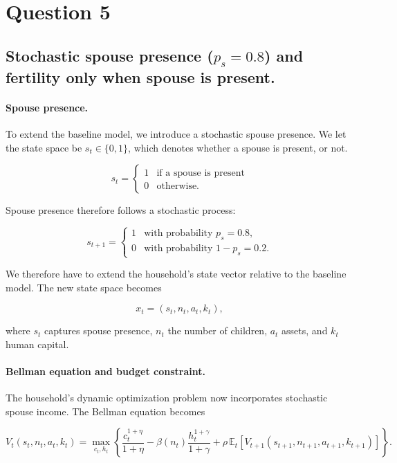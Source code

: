 \section{Question 5}

\subsection{Stochastic spouse presence ($p_s=0.8$) and fertility only when spouse is present.}

\bigskip

\paragraph{Spouse presence.}

To extend the baseline model, we introduce a stochastic spouse presence. We let the state space be $s_t \in \{0,1\}$, which denotes whether a spouse is present, or not. 

\[
s_t =
\begin{cases}
1 & \text{if a spouse is present} \\
0 & \text{otherwise.}
\end{cases}
\]

Spouse presence therefore follows a stochastic process:

\[
s_{t+1} =
\begin{cases}
1 & \text{with probability } p_s = 0.8, \\
0 & \text{with probability } 1-p_s = 0.2.
\end{cases}
\]

We therefore have to extend the household's state vector relative to the baseline model. The new state space becomes

\[
x_t = (s_t,n_t,a_t,k_t),
\]

where $s_t$ captures spouse presence, $n_t$ the number of children, $a_t$ assets, and $k_t$ human capital.

\paragraph{Bellman equation and budget constraint.}

The household's dynamic optimization problem now incorporates stochastic spouse income. The Bellman equation becomes

\[
V_t(s_t,n_t,a_t,k_t)
=
\max_{c_t,h_t}
\left\{
\frac{c_t^{1+\eta}}{1+\eta}
-
\beta(n_t)\frac{h_t^{1+\gamma}}{1+\gamma}
+
\rho \, \mathbb{E}_t
\left[
V_{t+1}(s_{t+1},n_{t+1},a_{t+1},k_{t+1})
\right]
\right\}.
\]

